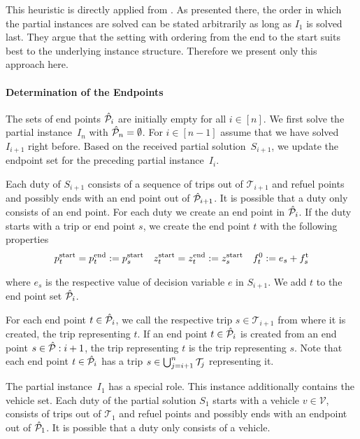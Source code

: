 This heuristic is directly applied from \cite[Sec.~10.4]{Knoll}. As presented there, the order in which the partial instances are solved can be stated arbitrarily as long as $I_1$ is solved last. They argue that the setting with ordering from the end to the start suits best to the underlying instance structure. Therefore we present only this approach here.

\paragraph{Determination of the Endpoints} \parfill

The sets of end points $\hat{\mathcal{P}}_i$ are initially empty for all $i\in[n]$. We first solve the partial instance~$I_n$ with ${\hat{\mathcal{P}}_n = \emptyset}$. For ${i\in[n-1]}$ assume that we have solved $I_{i+1}$ right before. Based on the received partial solution~$S_{i+1}$, we update the endpoint set for the preceding partial instance~$I_i$.

Each duty of $S_{i+1}$ consists of a sequence of trips out of $\mathcal{T}_{i+1}$ and refuel points and possibly ends with an end point out of $\hat{\mathcal{P}}_{i+1}$. It is possible that a duty only consists of an end point. For each duty we create an end point in $\hat{\mathcal{P}}_i$. If the duty starts with a trip or end point $s$, we create the end point $t$ with the following properties
\begin{align*}
	p^{\operatorname{start}}_t = p^{\operatorname{end}}_t := p^{\operatorname{start}}_s && z^{\operatorname{start}}_t = z^{\operatorname{end}}_t := z^{\operatorname{start}}_s && f_t^0 := e_s + f^{\operatorname{t}}_s
\end{align*}

where $e_s$ is the respective value of decision variable $e$ in $S_{i+1}$. We add $t$ to the end point set $\hat{\mathcal{P}}_i$.

For each end point $t\in\hat{\mathcal{P}}_i$, we call the respective trip $s\in\mathcal{T}_{i+1}$ from where it is created, the trip representing $t$. If an end point $t\in\hat{\mathcal{P}}_i$ is created from an end point $s\in\hat{\mathcal{P}}:{i+1}$, the trip representing $t$ is the trip representing $s$. Note that each end point $t\in\hat{\mathcal{P}}_i$ has a trip ${s\in\bigcup_{j=i+1}^n\mathcal{T}_j}$ representing it.

The partial instance~$I_1$ has a special role. This instance additionally contains the vehicle set. Each duty of the partial solution $S_1$ starts with a vehicle $v\in\mathcal{V}$, consists of trips out of $\mathcal{T}_1$ and refuel points and possibly ends with an endpoint out of $\hat{\mathcal{P}}_1$. It is possible that a duty only consists of a vehicle.

